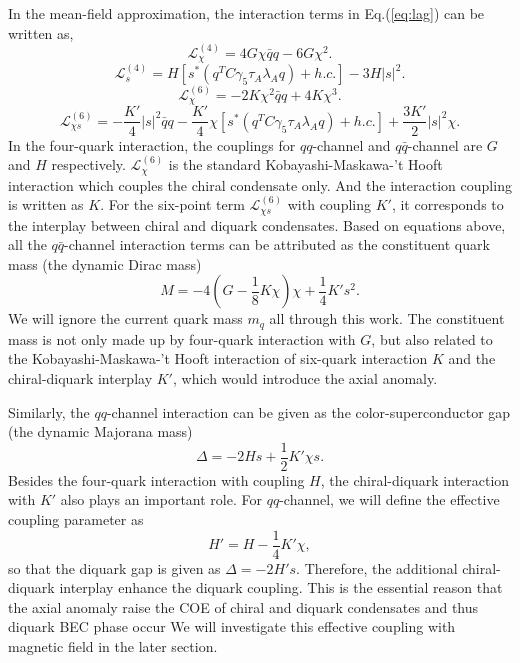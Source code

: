 \documentclass[prd, showpacs,nofootinbib,amsmath,amssymb,12pt]{revtex4}
\begin{document}
In the mean-field approximation, the interaction terms in Eq.(\ref{eq:lag}) can be written as\cite{abuki2010nambu},  
\begin{equation}
\mathcal{L}^{(4)}_{\chi}=4G\chi\bar{q}q-6G\chi^2.
\end{equation}	
\begin{equation}
\mathcal{L}^{(4)}_{s}=H[s^*(q^TC\gamma_5\tau_A\lambda_Aq)+h.c.]-3H|s|^2.
\end{equation}
\begin{equation}
\mathcal{L}^{\left(6\right)}_{\chi}=-2K\chi^2\bar{q}q+4K\chi^3.
\end{equation}
\begin{equation}
\mathcal{L}^{\left(6\right)}_{\chi s}=-\frac{K'}{4}|s|^2\bar{q}q-\frac{K'}{4}\chi[s^*(q^TC\gamma_5\tau_A\lambda_Aq)+h.c.]+\frac{3K'}{2}|s|^2\chi.
\end{equation}
In the four-quark interaction, the couplings for $qq$-channel and $q\bar{q}$-channel are $G$ and $H$ respectively.
$\mathcal{L}^{\left(6\right)}_{\chi}$ is the standard Kobayashi-Maskawa-'t Hooft interaction which couples the chiral condensate only.
And the interaction coupling is written as $K$.
For the six-point term $\mathcal{L}^{\left(6\right)}_{\chi s}$ with coupling $K'$, it corresponds to the interplay between chiral and diquark condensates.
Based on equations above, 
all the $q\bar{q}$-channel interaction terms can be attributed as  the constituent quark mass (the dynamic Dirac mass)
\begin{equation}
M = -4(G-\frac{1}{8}K\chi)\chi + \frac{1}{4}K's^2.
\label{Dmass}
\end{equation}
We will ignore the current quark mass $m_q$ all through this work.
The constituent mass is not only made up by four-quark interaction with $G$,
but also related to the Kobayashi-Maskawa-'t Hooft interaction of six-quark interaction $K$ and the chiral-diquark interplay $K'$, 
which would introduce the axial anomaly.

Similarly, the $qq$-channel  interaction can be given as the color-superconductor gap (the dynamic Majorana mass)
\begin{equation}
\Delta=-2Hs+\frac{1}{2}K'\chi s.
\end{equation}
Besides the four-quark interaction with coupling $H$, the chiral-diquark interaction with $K'$ also plays an important role.
For $qq$-channel, we will define the effective coupling parameter as
\begin{equation}
\label{eq:effectivecoupling}
H'=H - \frac{1}{4}K'\chi,
\end{equation}
so that the diquark gap is given as $\Delta=-2H's$. 
Therefore, the additional chiral-diquark interplay enhance the diquark coupling.
This is the essential reason that the axial anomaly raise the COE of chiral and diquark condensates and thus diquark BEC phase occur
We will investigate this effective coupling with magnetic field in the later section.
\end{document}
